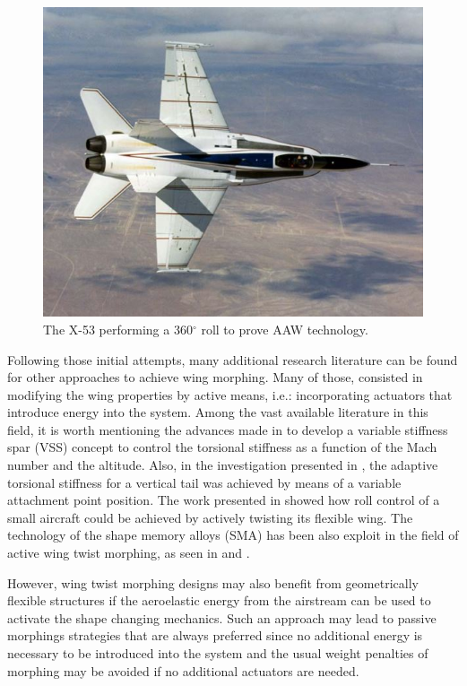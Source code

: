   \begin{figure}[!htpb]
    \centering
    \includegraphics[width=0.6 \textwidth]{figures/state-of-the-art/x-53}
    \caption[The X-53 performing a 360$^{\circ}$ roll to prove AAW technology]{The X-53 performing a 360$^{\circ}$ roll to prove AAW technology. \cite{NASA}}\label{fig:x-53}
  \end{figure}

  Following those initial attempts, many additional research literature can be found for other approaches to achieve wing morphing. Many of those, consisted in modifying the wing properties by active means, i.e.: incorporating actuators that introduce energy into the system. Among the vast available literature in this field, it is worth mentioning the advances made in \cite{Chen2000} to develop a variable stiffness spar (VSS) concept to control the torsional stiffness as a function of the Mach number and the altitude. Also, in the investigation presented in \cite{Amprikidis2005}, the adaptive torsional stiffness for a vertical tail was achieved by means of a variable attachment point position. The work presented in \cite{Stanford2007} showed how roll control of a small aircraft could be achieved by actively twisting its flexible wing. The technology of the shape memory alloys (SMA) has been also exploit in the field of active wing twist morphing, as seen in \cite{Sanders2001} and \cite{Elzey2003}.

  However, wing twist morphing designs may also benefit from geometrically flexible structures if the aeroelastic energy from the airstream can be used to activate the shape changing mechanics. Such an approach may lead to passive morphings strategies that are always preferred since no additional energy is necessary to be introduced into the system and the usual weight penalties of morphing may be avoided if no additional actuators are needed. 

